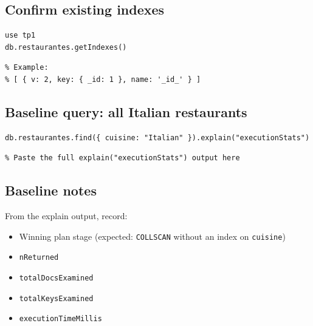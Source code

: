\documentclass[11pt]{article}
\begin{document}
\subsection{Confirm existing indexes}
\begin{cmd}
\begin{verbatim}
use tp1
db.restaurantes.getIndexes()
\end{verbatim}
\end{cmd}

\begin{out}
\begin{verbatim}
% Example:
% [ { v: 2, key: { _id: 1 }, name: '_id_' } ]
\end{verbatim}
\end{out}

\subsection{Baseline query: all Italian restaurants}
\begin{cmd}
\begin{verbatim}
db.restaurantes.find({ cuisine: "Italian" }).explain("executionStats")
\end{verbatim}
\end{cmd}

\begin{out}
\begin{verbatim}
% Paste the full explain("executionStats") output here
\end{verbatim}
\end{out}

\subsection{Baseline notes}
From the explain output, record:
\begin{itemize}
  \item Winning plan stage (expected: \texttt{COLLSCAN} without an index on \texttt{cuisine})
  \item \texttt{nReturned}
  \item \texttt{totalDocsExamined}
  \item \texttt{totalKeysExamined}
  \item \texttt{executionTimeMillis}
\end{itemize}
\end{document}
